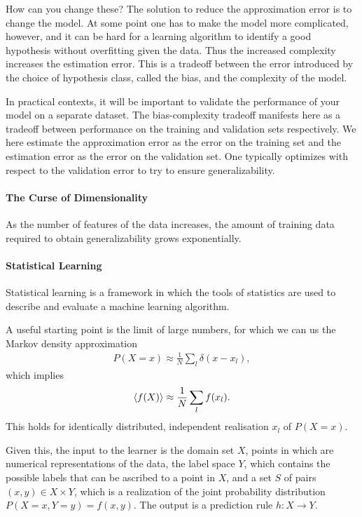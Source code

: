 How can you change these? The solution to reduce the approximation error is to change the model. At some point one has to make the model more complicated, however, and it can be hard for a learning algorithm to identify a good hypothesis without overfitting given the data. Thus the increased complexity increases the estimation error. This is a tradeoff between the error introduced by the choice of hypothesis class, called the bias, and the complexity of the model.

In practical contexts, it will be important to validate the performance of your model on a separate dataset. The bias-complexity tradeoff manifests here as a tradeoff between performance on the training and validation sets respectively. We here estimate the approximation error as the error on the training set and the estimation error as the error on the validation set. One typically optimizes with respect to the validation error to try to ensure generalizability.

\paragraph{The Curse of Dimensionality}
As the number of features of the data increases, the amount of training data required to obtain generalizability grows exponentially.

\paragraph{Statistical Learning}
Statistical learning is a framework in which the tools of statistics are used to describe and evaluate a machine learning algorithm.

A useful starting point is the limit of large numbers, for which we can us the Markov density approximation
\begin{align*}
	P(X = x) \approx \frac{1}{N}\sum\limits_{l}\delta(x - x_{l}),
\end{align*}
which implies
\begin{align*}
	\expval{f(X)} \approx \frac{1}{N}\sum\limits_{l}f(x_{l}).
\end{align*}
This holds for identically distributed, independent realisation $x_{l}$ of $P(X = x)$.

Given this, the input to the learner is the domain set $X$, points in which are numerical representations of the data, the label space $Y$, which contains the possible labels that can be ascribed to a point in $X$, and a set $S$ of pairs $(x, y)\in X\times Y$, which is a realization of the joint probability distribution $P(X = x, Y = y) = f(x, y)$. The output is a prediction rule $h: X\to Y$.

